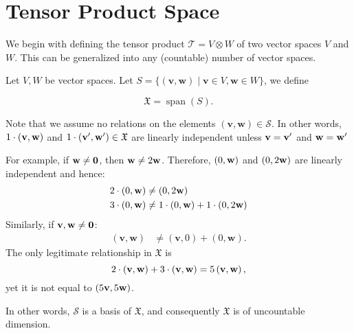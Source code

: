 \section{Tensor Product Space}
We begin with defining the tensor product $\mathcal{T} = V \otimes W$ of two vector spaces $V$ and $W$. This can be generalized into any (countable) number of vector spaces.


\begin{definition} Let \(V,W\) be vector spaces. Let \(S = \{ \left( {\mathbf{v},\mathbf{w}}\right)  \mid  \mathbf{v} \in  V,\mathbf{w} \in  W\}\), we define

\[
\mathfrak{X} = \operatorname{span}\left( S\right).
\]
\end{definition}

\begin{remark}
    Note that we assume no relations on the elements \(\left( {\mathbf{v},\mathbf{w}}\right)  \in  \mathcal{S}\). In other words, $1\cdot ({\bf v}, {\bf w})$ and $1 \cdot ({\bf v}', {\bf w}') \in \mathfrak{X}$ are linearly independent unless ${\bf v} = {\bf v}'$ and ${\bf w} = {\bf w}'$ 
    
    For example, if ${\bf w} \neq {\bf 0}$, then ${\bf w} \neq 2{\bf w}$. Therefore, $(0,{\bf w})$ and $(0, 2{\bf w})$ are linearly independent and hence:
    \begin{align*} 
    2\cdot \left( {0,\mathbf{w}}\right)  &\neq  \left( {0,2\mathbf{w}}\right)\\
3\cdot \left( {0,\mathbf{w}}\right) &\neq 1\cdot \left( {0,\mathbf{w}}\right)  + 1\cdot\left( {0,{2\bf w}}\right)  \end{align*}
Similarly, if ${\bf v}, {\bf w} \neq {\bf 0}$:
\begin{align*}
\left(\mathbf{v},\mathbf{w}\right) &\neq \left( \mathbf{v},0\right)  +  \left( 0,\mathbf{w}\right). \end{align*}
The only legitimate relationship in $\mathfrak{X}$ is
\[
2\cdot \left( \mathbf{v},{\bf w}\right)  + 3\cdot \left(\mathbf{v},\mathbf{w}\right)  = 5\left( {\mathbf{v},\mathbf{w}}\right) ,
\]
yet it is not equal to $(5{\bf v},5{\bf w})$.

\noindent In other words, \(\mathcal{S}\) is a basis of \(\mathfrak{X}\), and consequently \(\mathfrak{X}\) is of uncountable dimension.
\end{remark}

